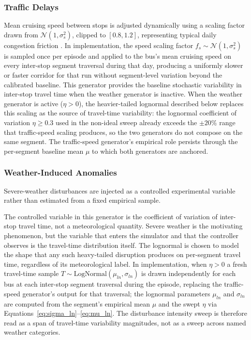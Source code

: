 \subsubsection{Traffic Delays}

Mean cruising speed between stops is adjusted dynamically using a scaling factor drawn from $\mathcal{N}(1, \sigma_s^2)$, clipped to $[0.8, 1.2]$, representing typical daily congestion friction \cite{Wangsun}. In implementation, the speed scaling factor $f_s \sim \mathcal{N}(1, \sigma_s^2)$ is sampled once per episode and applied to the bus's mean cruising speed on every inter-stop segment traversal during that day, producing a uniformly slower or faster corridor for that run without segment-level variation beyond the calibrated baseline. This generator provides the baseline stochastic variability in inter-stop travel time when the weather generator is inactive. When the weather generator is active ($\eta > 0$), the heavier-tailed lognormal described below replaces this scaling as the source of travel-time variability: the lognormal coefficient of variation $\eta \geq 0.3$ used in the non-ideal sweep already exceeds the $\pm 20\%$ range that traffic-speed scaling produces, so the two generators do not compose on the same segment. The traffic-speed generator's empirical role persists through the per-segment baseline mean $\mu$ to which both generators are anchored.

\subsubsection{Weather-Induced Anomalies}

Severe-weather disturbances are injected as a controlled experimental variable rather than estimated from a fixed empirical sample.

The controlled variable in this generator is the coefficient of variation of inter-stop travel time, not a meteorological quantity. Severe weather is the motivating phenomenon, but the variable that enters the simulator and that the controller observes is the travel-time distribution itself. The lognormal is chosen to model the shape that any such heavy-tailed disruption produces on per-segment travel time, regardless of its meteorological label. In implementation, when $\eta > 0$ a fresh travel-time sample $T \sim \text{LogNormal}(\mu_{ln}, \sigma_{ln})$ is drawn independently for each bus at each inter-stop segment traversal during the episode, replacing the traffic-speed generator's output for that traversal; the lognormal parameters $\mu_{ln}$ and $\sigma_{ln}$ are computed from the segment's empirical mean $\mu$ and the swept $\eta$ via Equations~\eqref{eq:sigma_ln}--\eqref{eq:mu_ln}. The disturbance intensity sweep is therefore read as a span of travel-time variability magnitudes, not as a sweep across named weather categories.

